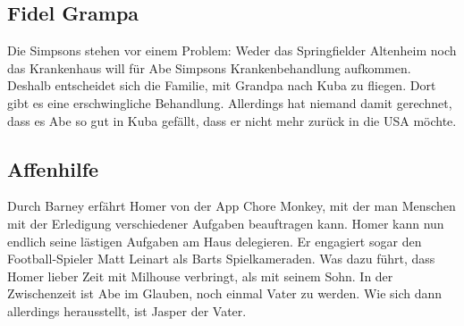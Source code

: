 \subsection{Fidel Grampa}\label{VABF19}
Die Simpsons stehen vor einem Problem: Weder das Springfielder Altenheim noch das Krankenhaus will für Abe Simpsons Krankenbehandlung aufkommen. Deshalb entscheidet sich die Familie, mit Grandpa nach Kuba zu fliegen. Dort gibt es eine erschwingliche Behandlung. Allerdings hat niemand damit gerechnet, dass es Abe so gut in Kuba gefällt, dass er nicht mehr zurück in die USA möchte.


\subsection{Affenhilfe}\label{WABF01}
Durch Barney erfährt Homer von der App \glqq Chore Monkey\grqq{}, mit der man Menschen mit der Erledigung verschiedener Aufgaben beauftragen kann. Homer kann nun endlich seine lästigen Aufgaben am Haus delegieren. Er engagiert sogar den Football-Spieler Matt Leinart als Barts Spielkameraden. Was dazu führt, dass Homer lieber Zeit mit Milhouse verbringt, als mit seinem Sohn. In der Zwischenzeit ist Abe im Glauben, noch einmal Vater zu werden. Wie sich dann allerdings herausstellt, ist Jasper der Vater.


